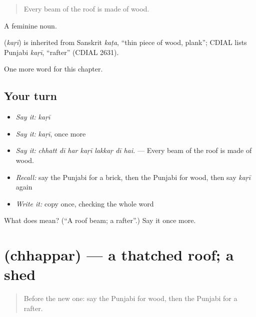 \begin{quote}
Every beam of the roof is made of wood.
\end{quote}

A feminine noun.

\begin{cousinweb}
\textbf{} (\emph{kaṛī}) is inherited from Sanskrit \emph{kaṭa}, \textquotedblleft{}thin piece of wood, plank\textquotedblright{}; CDIAL lists Punjabi \emph{kaṛī}, \textquotedblleft{}rafter\textquotedblright{} (CDIAL 2631).
\end{cousinweb}

\begin{grammarlens}[title={What you've built}]
One more word for this chapter.
\end{grammarlens}

\subsection*{Your turn}
\begin{itemize}
\raggedright
  \item \emph{Say it:} \emph{kaṛī}
  \item \emph{Say it:} \emph{kaṛī}, once more
  \item \emph{Say it:} \emph{chhatt dī har kaṛī lakkaṛ dī hai.} — Every beam of the roof is made of wood.
  \item \emph{Recall:} say the Punjabi for a brick, then the Punjabi for wood, then say \emph{kaṛī} again
  \item \emph{Write it:} copy \textbf{} once, checking the whole word
\end{itemize}

\begin{tcolorbox}[breakable,colback=teal!4,colframe=teal!35!black,title={Before you move on}]
What does  mean? (\textquotedblleft{}A roof beam; a rafter\textquotedblright{}.) Say it once more.
\end{tcolorbox}
\section[\texorpdfstring{\pa{ਛੱਪਰ} (chhappar)}{ਛੱਪਰ (chhappar)}]{ (chhappar) — a thatched roof; a shed}

\label{lesson:PA-C246-chhappar}



\begin{quote}
Before the new one: say the Punjabi for wood, then the Punjabi for a rafter.
\end{quote}

